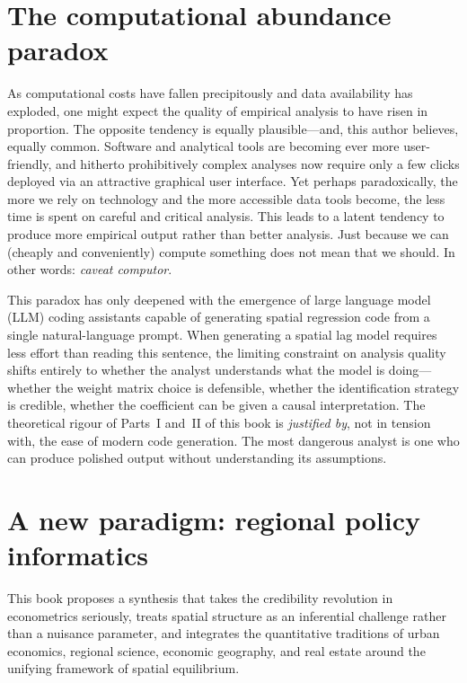 \section*{The computational abundance paradox}

As computational costs have fallen precipitously and data availability has
exploded, one might expect the quality of empirical analysis to have risen in
proportion. The opposite tendency is equally plausible---and, this author
believes, equally common. Software and analytical tools are becoming ever more
user-friendly, and hitherto prohibitively complex analyses now require only a
few clicks deployed via an attractive graphical user interface. Yet perhaps
paradoxically, the more we rely on technology and the more accessible data
tools become, the less time is spent on careful and critical analysis. This
leads to a latent tendency to produce more empirical output rather than better
analysis. Just because we can (cheaply and conveniently) compute something does
not mean that we should. In other words: \emph{caveat computor}.

This paradox has only deepened with the emergence of large language model
(LLM) coding assistants capable of generating spatial regression code from a
single natural-language prompt. When generating a spatial lag model requires
less effort than reading this sentence, the limiting constraint on analysis
quality shifts entirely to whether the analyst understands what the model is
doing---whether the weight matrix choice is defensible, whether the
identification strategy is credible, whether the coefficient can be given a
causal interpretation. The theoretical rigour of Parts~I and~II of this
book is \emph{justified by}, not in tension with, the ease of modern code
generation. The most dangerous analyst is one who can produce polished output
without understanding its assumptions.

\section*{A new paradigm: regional policy informatics}

This book proposes a synthesis that takes the credibility revolution in
econometrics seriously, treats spatial structure as an inferential challenge
rather than a nuisance parameter, and integrates the quantitative traditions
of urban economics, regional science, economic geography, and real estate
around the unifying framework of spatial equilibrium.

